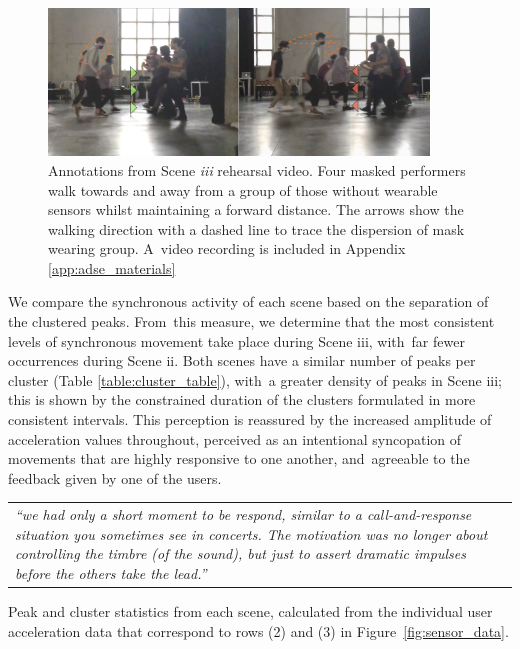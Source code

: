 \begin{figure}[!h]
\centering
\includegraphics[width=0.9\textwidth,keepaspectratio]{Chapters/Figures/adse_ess/scene_iii-merged-2.png}
{
\caption[Annotations from Scene \textit{iii} rehearsal video]{Annotations from Scene \textit{iii} rehearsal video. Four masked performers walk towards and away from a group of those without wearable sensors whilst maintaining a forward distance. The arrows show the walking direction with a dashed line to trace the dispersion of mask wearing group. A~video recording is included in Appendix \ref{app:adse_materials}
}
\label{fig:scene_iii_annotation}
}
\end{figure}

We compare the synchronous activity of each scene based on the separation of the clustered peaks. From~this measure, we determine that the most consistent levels of synchronous movement take place during Scene iii, with~far fewer occurrences during Scene ii. Both scenes have a similar number of peaks per cluster (Table \ref{table:cluster_table}), with~a greater density of peaks in Scene iii; this is shown by the constrained duration of the clusters formulated in more consistent intervals. This perception is reassured by the increased amplitude of acceleration values throughout, perceived as an intentional syncopation of movements that are highly responsive to one another, and~agreeable to the feedback given by one of the users.

\begin{center}
\begin{tabular}{ p{13cm}}
\textit{``we had only a short moment to be respond, similar to a call-and-response situation you sometimes see in concerts. The motivation was no longer about controlling the timbre (of the sound), but just to assert dramatic impulses before the others take the lead.''}
\end{tabular}
\end{center}

\begin{table}[!h]

{\caption[Peak and cluster statistics from each scene]{Peak and cluster statistics from each scene, calculated from the individual user acceleration data that correspond to rows (2) and (3) in Figure~\ref{fig:sensor_data}.}
\label{table:cluster_table}}
\end{table}

